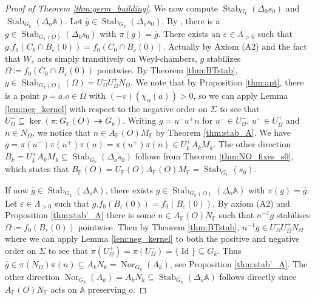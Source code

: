 \documentclass[12pt]{amsart}
\newcommand{\F}{\mathbb{F} }
\newcommand{\A}{\mathbb{A}}
\numberwithin{equation}{section}
\theoremstyle{remark} %
\begin{document}
\begin{proof}[Proof of Theorem \ref{thm:germ_building}]
    We now compute $\operatorname{Stab}_{G_k}(\Delta_0s_0)$ and $\operatorname{Stab}_{G_k}(\Delta_{o}\A)$. Let $\overline{g} \in \operatorname{Stab}_{G_k}(\Delta_os_0)$. By \cite[Proposition 2.18]{BIPP23arxiv}, there is a $g\in \operatorname{Stab}_{G_\F(O)}(\Delta_0s_0)$ with $\pi(g)=\overline{g}$. There exists an $\varepsilon \in \Lambda_{>0}$ such that $g.f_0(C_0 \cap B_{\varepsilon}(0)) = f_0(C_0 \cap B_{\varepsilon}(0))$. Actually by Axiom (A2) and the fact that $W_s$ acts simply transitively on Weyl-chambers, $g$ stabilizes $\Omega \coloneqq f_0(C_0 \cap B_{\varepsilon}(0))$ pointwise. %
    By Theorem \ref{thm:BTstab}, $g \in \operatorname{Stab}_{G_\F(O)}(\Omega) = U_\Omega^{-}U_\Omega^+N_\Omega$. We note that by Proposition \ref{thm:apt}, there is a point $p=a.o \in \Omega$ with $(-v)(\chi_{\alpha}(a)) > 0$, so we can apply Lemma \ref{lem:neg_kernel} with respect to the negative order on $\Sigma$ to see that $U_\Omega^- \subseteq \ker(\pi \colon G_\F(O) \twoheadrightarrow G_k)$. Writing $g=u^{-}u^+n$ for $u^- \in U_\Omega^-$, $u^+ \in U_\Omega^+$ and $n \in N_\Omega$, we notice that $n\in A_\F(O)M_{\F}$ by Theorem \ref{thm:stab_A}. We have $\overline{g}=\pi(u^{-})\pi(u^+)\pi(n) = \pi(u^+)\pi(n) \in U_k^+A_kM_k$. The other direction $B_k = U_k^+A_kM_k \subseteq \operatorname{Stab}_{G_k}(\Delta_os_0)$ follows from Theorem \ref{thm:NO_fixes_s0}, which states that $B_\F(O) = U_\F(O)A_\F(O)M_\F = \operatorname{Stab}_{G_{\F}}(s_0)$.
    
    If now $\overline{g} \in \operatorname{Stab}_{G_k}(\Delta_o\A)$, there exists $g\in \operatorname{Stab}_{G_\F(O)}(\Delta_o\A)$ with $\pi(g)=\overline{g}$. Let $\varepsilon \in \Lambda_{>0}$ such that $g.f_0(B_{\varepsilon}(0)) = f_0(B_{\varepsilon}(0))$. By axiom (A2) and Proposition \ref{thm:stab'_A} there is some $n\in A_\F(O)N_\F$ such that $n^{-1}g$ stabilises $\Omega \coloneqq  f_0(B_{\varepsilon}(0))$ pointwise. Then by Theorem \ref{thm:BTstab}, $n^{-1}g \in U_\Omega^-U_\Omega^+N_\Omega$ where we can apply Lemma \ref{lem:neg_kernel} to both the positive and negative order on $\Sigma$ to see that $\pi (U_\Omega^+) = \pi (U_\Omega^{-}) = \{\operatorname{Id}\} \subseteq G_k$. Thus $\overline{g} \in \pi(N_\Omega)\pi(n) \subseteq A_k N_k = \operatorname{Nor}_{G_k}(A_k)$, see Proposition \ref{thm:stab'_A}. The other direction $\operatorname{Nor}_{G_k}(A_k) = A_kN_k \subseteq \operatorname{Stab}_{G_k}(\Delta_o\A)$ follows directly since $A_\F(O)N_\F$ acts on $\A$ preserving $o$. 
\end{proof}
\end{document}
